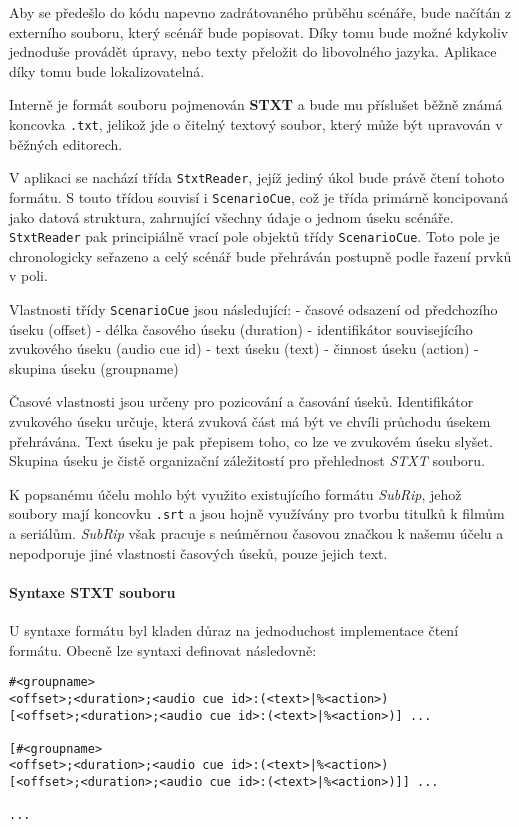 Aby se předešlo do kódu napevno zadrátovaného průběhu scénáře, bude
načítán z externího souboru, který scénář bude popisovat. Díky tomu bude
možné kdykoliv jednoduše provádět úpravy, nebo texty přeložit do
libovolného jazyka. Aplikace díky tomu bude lokalizovatelná.

Interně je formát souboru pojmenován \textbf{STXT} a bude mu příslušet
běžně známá koncovka \texttt{.txt}, jelikož jde o čitelný textový
soubor, který může být upravován v běžných editorech.

V aplikaci se nachází třída \texttt{StxtReader}, jejíž jediný úkol bude
právě čtení tohoto formátu. S touto třídou souvisí i
\texttt{ScenarioCue}, což je třída primárně koncipovaná jako datová
struktura, zahrnující všechny údaje o jednom úseku scénáře.
\texttt{StxtReader} pak principiálně vrací pole objektů třídy
\texttt{ScenarioCue}. Toto pole je chronologicky seřazeno a celý scénář
bude přehráván postupně podle řazení prvků v poli.

Vlastnosti třídy \texttt{ScenarioCue} jsou následující: - časové
odsazení od předchozího úseku (offset) - délka časového úseku (duration)
- identifikátor souvisejícího zvukového úseku (audio cue id) - text
úseku (text) - činnost úseku (action) - skupina úseku (groupname)

Časové vlastnosti jsou určeny pro pozicování a časování úseků.
Identifikátor zvukového úseku určuje, která zvuková část má být ve
chvíli průchodu úsekem přehrávána. Text úseku je pak přepisem toho, co
lze ve zvukovém úseku slyšet. Skupina úseku je čistě organizační
záležitostí pro přehlednost \emph{STXT} souboru.

K popsanému účelu mohlo být využito existujícího formátu \emph{SubRip},
jehož soubory mají koncovku \texttt{.srt} a jsou hojně využívány pro
tvorbu titulků k filmům a seriálům. \emph{SubRip} však pracuje s
neúměrnou časovou značkou k našemu účelu a nepodporuje jiné vlastnosti
časových úseků, pouze jejich text.

\paragraph{Syntaxe STXT souboru}\label{syntaxe-stxt-souboru}

U syntaxe formátu byl kladen důraz na jednoduchost implementace čtení
formátu. Obecně lze syntaxi definovat následovně:

\begin{verbatim}
#<groupname>
<offset>;<duration>;<audio cue id>:(<text>|%<action>)
[<offset>;<duration>;<audio cue id>:(<text>|%<action>)] ...

[#<groupname>
<offset>;<duration>;<audio cue id>:(<text>|%<action>)
[<offset>;<duration>;<audio cue id>:(<text>|%<action>)]] ...

...
\end{verbatim}

